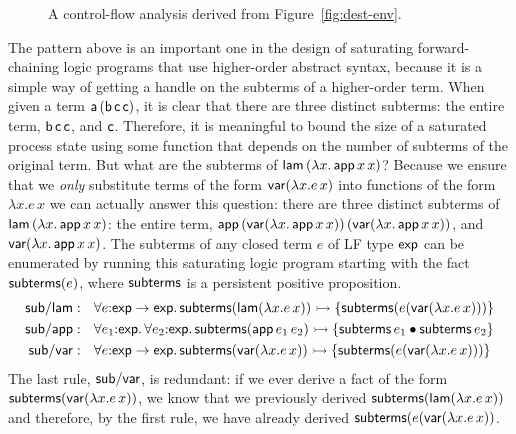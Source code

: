 \begin{figure}[t]
\caption{A control-flow analysis derived from Figure~\ref{fig:dest-env}.}
\label{fig:dest-cfa-1}
\end{figure}

The pattern above is an important one in the design of saturating
forward-chaining logic programs that use higher-order abstract syntax,
because it is a simple way of getting a handle on the subterms of a
higher-order term. When given a term ${\sf a}\,({\sf b}\,{\sf c}\,{\sf
  c})$, it is clear that there are three distinct subterms: the entire
term, ${\sf b}\,{\sf c}\,{\sf c}$, and ${\sf c}$. Therefore, it is
meaningful to bound the size of a saturated process state using some
function that depends on the number of subterms of the original
term. But what are the subterms of ${\sf lam}\,(\lambda x.\,{\sf
  app}\,x\,x)$?  Because we ensure that we {\it only} substitute terms
of the form ${\sf var}(\lambda x.e\,x)$ into functions of the form
$\lambda x.e\,x$ we can actually answer this question: there are three
distinct subterms of ${\sf lam}\,(\lambda x.\,{\sf app}\,x\,x)$: the
entire term, ${\sf app}\,({\sf var}(\lambda x.\,{\sf
  app}\,x\,x))\,({\sf var}(\lambda x.\,{\sf app}\,x\,x))$, and ${\sf
  var}(\lambda x.\,{\sf app}\,x\,x)$.  The subterms of any closed term
$e$ of LF type ${\sf exp}$ can be enumerated by running this
saturating logic program starting with the fact ${\sf subterms}(e)$,
where ${\sf subterms}$ is a persistent positive proposition.
\begin{align*}
{\sf sub/lam} &: ~~
  \forall e{:}{\sf exp} \rightarrow {\sf exp}.\,
    {\sf subterms}({\sf lam}(\lambda x.e\,x)) \rightarrowtail
      \{ {\sf subterms}(e({\sf var}(\lambda x.e\,x))) \}
\\
{\sf sub/app} &: ~~
  \forall e_1{:}{\sf exp}.\, \forall e_2{:}{\sf exp}.\,
    {\sf subterms}({\sf app}\,e_1\,e_2) \rightarrowtail
      \{ {\sf subterms}\,e_1 \mathbin{\bullet} {\sf subterms}\,e_2 \}
\\
{\sf sub/var} &: ~~ 
  \forall e{:}{\sf exp} \rightarrow {\sf exp}.\,
    {\sf subterms}({\sf var}(\lambda x.e\,x)) \rightarrowtail
      \{ {\sf subterms}(e({\sf var}(\lambda x.e\,x))) \}
\end{align*}
The last rule, ${\sf sub/var}$, is redundant: if we ever derive a fact
of the form ${\sf subterms}({\sf var}(\lambda x.e\,x))$, we know that
we previously derived ${\sf subterms}({\sf lam}(\lambda x.e\,x))$ and
therefore, by the first rule, we have already derived ${\sf
  subterms}(e({\sf var}(\lambda x.e\,x))$.



